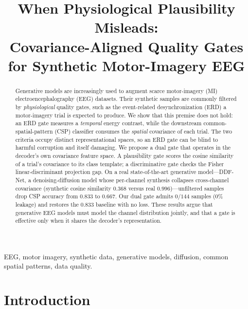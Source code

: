 \documentclass[conference]{IEEEtran}
\begin{document}
\title{When Physiological Plausibility Misleads:\\ Covariance-Aligned Quality Gates for Synthetic Motor-Imagery EEG}

\author{
}

\maketitle

\begin{abstract}
Generative models are increasingly used to augment scarce motor-imagery (MI)
electroencephalography (EEG) datasets. Their synthetic samples are commonly
filtered by \emph{physiological} quality gates, such as the event-related
desynchronization (ERD) a motor-imagery trial is expected to produce. We show
that this premise does not hold: an ERD gate measures a \emph{temporal} energy
contrast, while the downstream common-spatial-pattern (CSP) classifier consumes
the \emph{spatial} covariance of each trial. The two criteria occupy distinct
representational spaces, so an ERD gate can be blind to harmful corruption and
itself damaging. We propose a dual gate that operates in the decoder's own
covariance feature space. A plausibility gate scores the cosine similarity of a
trial's covariance to its class template; a discriminative gate checks the Fisher
linear-discriminant projection gap. On a real state-of-the-art generative
model---DDF-Net, a denoising-diffusion model whose per-channel synthesis
collapses cross-channel covariance (synthetic cosine similarity $0.368$ versus
real $0.996$)---unfiltered samples drop CSP accuracy from $0.833$ to $0.667$.
Our dual gate admits $0/144$ samples ($0\%$ leakage) and restores the $0.833$
baseline with no loss. These results argue that generative EEG models must model
the channel distribution jointly, and that a gate is effective only when it
shares the decoder's representation.
\end{abstract}

\begin{IEEEkeywords}
EEG, motor imagery, synthetic data, generative models, diffusion, common
spatial patterns, data quality.
\end{IEEEkeywords}

\section{Introduction}
\label{sec:intro}
\end{document}
